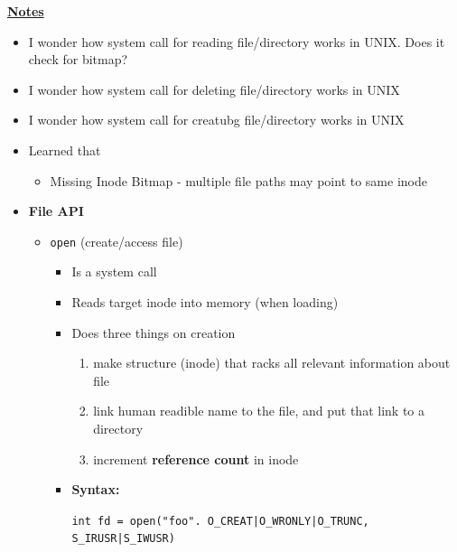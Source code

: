\documentclass[12pt]{article}
\begin{document}
\begin{enumerate}[1.]
\begin{enumerate}
        \bigskip

        \underline{\textbf{Notes}}

        \begin{itemize}
            \item I wonder how system call for reading file/directory works in UNIX. Does it check for bitmap?
            \item I wonder how system call for deleting file/directory works in UNIX
            \item I wonder how system call for creatubg file/directory works in UNIX
            \item Learned that
            \begin{itemize}
                \item Missing Inode Bitmap - multiple file paths may point to same inode
            \end{itemize}
            \item \textbf{File API}
            \begin{itemize}
                \item \texttt{open} (create/access file)
                \begin{itemize}
                    \item Is a system call
                    \item Reads target inode into memory (when loading)
                    \item Does three things on creation

                    \begin{enumerate}[1)]
                        \item make structure (inode) that racks all relevant information about file
                        \item link human readible name to the file, and put that link to a directory
                        \item increment \textbf{reference count} in inode
                    \end{enumerate}

                    \item \textbf{Syntax:}

                    \bigskip

                    \texttt{int fd = open("foo". O\_CREAT|O\_WRONLY|O\_TRUNC, S\_IRUSR|S\_IWUSR)}

                    \bigskip


\end{itemize}
\end{itemize}
\end{itemize}
\end{enumerate}
\end{enumerate}
\end{document}
